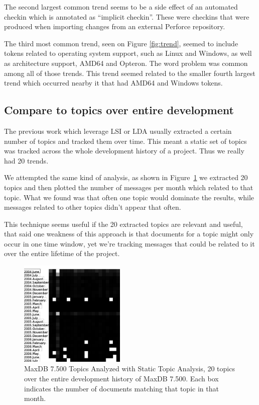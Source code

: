 \documentclass[times, 10pt,twocolumn]{article}
\begin{document}
The second largest common trend seems to be a side effect of an
automated checkin which is annotated as ``implicit checkin''. These
were checkins that were produced when importing changes from an
external Perforce repository.

The third most common trend, seen on Figure \ref{fig:trend}, seemed to
include tokens related to operating system support, such as Linux and
Windows, as well as architecture support, AMD64 and Opteron. The word
problem was common among all of those trends. This trend seemed
related to the smaller fourth largest trend which occurred nearby it
that had AMD64 and Windows tokens.

\subsection{Compare to topics over entire development}

The previous work which leverage LSI or LDA usually extracted a
certain number of topics and tracked them over time. This meant a
static set of topics was tracked across the whole development history
of a project. Thus we really had 20 trends. 

We attempted the same kind of analysis, as shown in
Figure~\ref{fig:statictopics} we extracted 20 topics and then plotted
the number of messages per month which related to that topic. What we
found was that often one topic would dominate the results, while
messages related to other topics didn't appear that often.

This technique seems useful if the 20 extracted topics are relevant
and useful, that said one weakness of this approach is that documents
for a topic might only occur in one time window, yet we're tracking
messages that could be related to it over the entire lifetime of the
project.

\begin{figure}
  \centering
  \includegraphics[width=0.45\textwidth]{maxdb7500-everything-by-month}
  \caption{MaxDB 7.500 Topics Analyzed with Static Topic Analysis, 20
    topics over the entire development history of MaxDB 7.500. Each
    box indicates the number of documents matching that topic in that
    month.}
  \label{fig:statictopics}
\end{figure}
\end{document}
